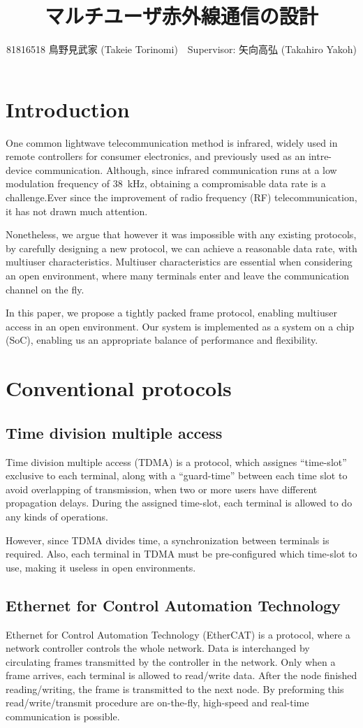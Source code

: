 ﻿\documentclass[twocolumn,9pt]{ltjsarticle}
\title{マルチユーザ赤外線通信の設計}
\author{81816518 鳥野見武家 (Takeie Torinomi)　Supervisor: 矢向高弘 (Takahiro Yakoh)}
\begin{document}
\maketitle
\section{Introduction}
One common lightwave telecommunication method is infrared, widely used in remote controllers for consumer electronics, and previously used as an intre-device communication.
Although, since infrared communication runs at a low modulation frequency of \SI{38}{kHz}, obtaining a compromisable data rate is a challenge.Ever since the improvement of radio frequency (RF) telecommunication, it has not drawn much attention.

Nonetheless, we argue that however it was impossible with any existing protocols, by carefully designing a new protocol, we can achieve a reasonable data rate, with multiuser characteristics.
Multiuser characteristics are essential when considering an open environment, where many terminals enter and leave the communication channel on the fly.

In this paper, we propose a tightly packed frame protocol, enabling multiuser access in an open environment.
Our system is implemented as a system on a chip (SoC), enabling us an appropriate balance of performance and flexibility.

\section{Conventional protocols}

\subsection{Time division multiple access}
Time division multiple access (TDMA) is a protocol, which assignes ``time-slot'' exclusive to each terminal, along with a ``guard-time'' between each time slot to avoid overlapping of transmission, when two or more users have different propagation delays.
During the assigned time-slot, each terminal is allowed to do any kinds of operations.

However, since TDMA divides time, a synchronization between terminals is required.
Also, each terminal in TDMA must be pre-configured which time-slot to use, making it useless in open environments.

\subsection{Ethernet for Control Automation Technology}
Ethernet for Control Automation Technology (EtherCAT) is a protocol, where a network controller controls the whole network.
Data is interchanged by circulating frames transmitted by the controller in the network.
Only when a frame arrives, each terminal is allowed to read/write data.
After the node finished reading/writing, the frame is transmitted to the next node.
By preforming this read/write/transmit procedure are on-the-fly, high-speed and real-time communication is possible.
\end{document}
